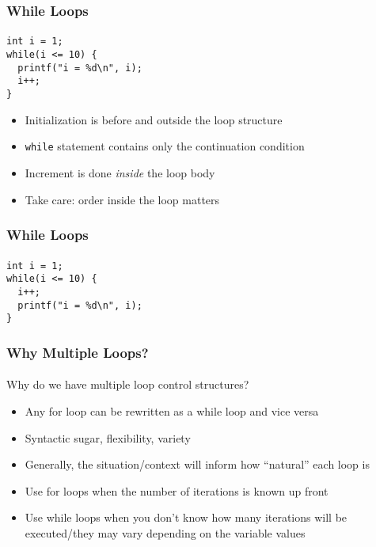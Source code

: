 \documentclass[]{beamer}
\begin{document}
\begin{frame}[fragile]
  \frametitle{While Loops}
  \framesubtitle{}

\begin{verbatim}
int i = 1; 
while(i <= 10) {
  printf("i = %d\n", i);
  i++;
}
\end{verbatim}


\begin{itemize}[<+(1)->]
  \item Initialization is before and outside the loop structure
  \item \texttt{while} statement contains only the continuation condition
  \item Increment is done \emph{inside} the loop body
  \item Take care: order inside the loop matters
\end{itemize}

\end{frame}


\begin{frame}[fragile]
  \frametitle{While Loops}
  \framesubtitle{}

\begin{verbatim}
int i = 1; 
while(i <= 10) {
  i++;
  printf("i = %d\n", i);
}
\end{verbatim}

\end{frame}


\begin{frame}[fragile]
  \frametitle{Why Multiple Loops?}
  \framesubtitle{}

Why do we have multiple loop control structures?
\begin{itemize}[<+(1)->]
  \item Any for loop can be rewritten as a while loop and vice versa
  \item Syntactic sugar, flexibility, variety
  \item Generally, the situation/context will inform how ``natural'' each loop is
  \item Use for loops when the number of iterations is known up front 
  \item Use while loops when you don't know how many iterations will be executed/they may vary depending on the variable values
\end{itemize}

\end{frame}
\end{document}
